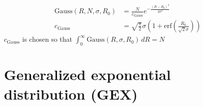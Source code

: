 \begin{subequations}
\begin{align}
\text{Gauss}(R,N,\sigma,R_0)&= \frac{N}{c_\text{Gauss}}
e^{-\frac{\left(R-R_0\right)^2}{2\sigma^2}}
\label{eq:GaussDistribution} \\
c_\text{Gauss} &=\sqrt{\frac{\pi}{2}}\sigma\left(1 +
\text{erf}\left(\frac{R_0}{\sqrt{2}\sigma}\right) \right)
\end{align}
\end{subequations}
$c_\text{Gauss}$ is chosen so that $\int_0^\infty\!
\text{Gauss}(R,\sigma,R_0)\,dR = N$


\clearpage
\section{Generalized exponential distribution (GEX)}

